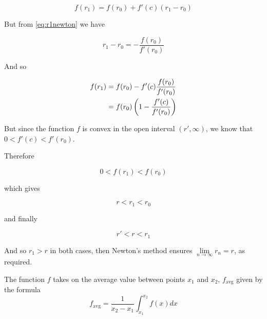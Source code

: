 \begin{lemma}
\begin{pf}
\begin{itemize}
$$f(r_1)= f(r_0) + f'(c)(r_1-r_0)$$

But from \ref{eq:r1newton} we have 

$$r_1-r_0 = - \frac{f(r_0)}{f'(r_0)}$$

And so 

\begin{align}
f(r_1) 
&= f(r_0) - f'(c)\frac{f(r_0)}{f'(r_0)} \\
&= f(r_0)\left(1-\frac{f'(c)}{f'(r_0)}\right)
\end{align}

But since the function $f$ is convex in the open interval $(r',\infty)$, we know that $0 < f'(c) <f'(r_0)$.

Therefore 

$$0<f(r_1) < f(r_0)$$

which gives

$$r < r_1 < r_0$$

and finally

\begin{equation}\label{r1ineq}
r' < r < r_1
\end{equation}
\end{itemize}
And so $r_1>r$ in both cases, then Newton's method ensures $\lim\limits_{n\to\infty} r_n = r$, as required.
\end{pf}
\end{lemma}


\begin{definition}
The function $f$ takes on the average value between points $x_1$ and $x_2$, $f_{\text{avg}}$  given by the formula 
\begin{equation} \label{eq:avgvalue}
    f_{\text{avg}} = \frac1{x_2-x_1} \int_{x_1}^{x_2} f(x)dx
\end{equation}
\end{definition}

